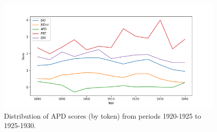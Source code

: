 \documentclass[10pt, a4paper]{article}
\begin{document}



\begin{figure}[!ht]
\begin{center}
\includegraphics[scale=0.5]{code/diachronicdist.png}
\caption{Distribution of APD scores (by token) from periods 1920-1925 to 1925-1930.}
\label{diachronicdist}
\end{center}
\end{figure}
\end{document}
